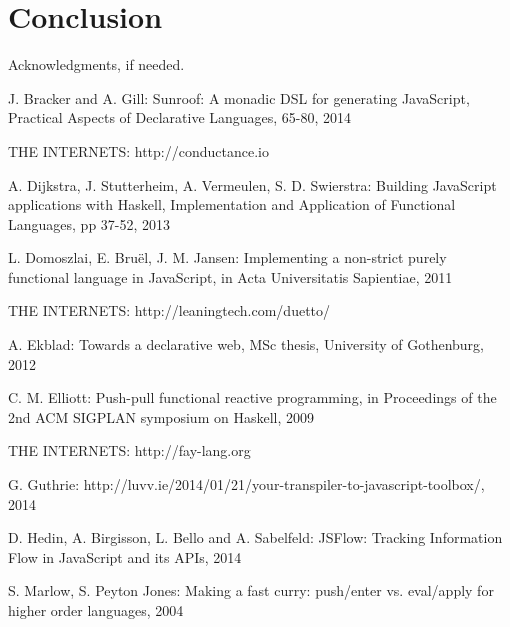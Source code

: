 \documentclass[preprint]{sigplanconf}
\begin{document}
\section{Conclusion}

\acks

Acknowledgments, if needed.





\begin{thebibliography}{}
\softraggedright

J. Bracker and A. Gill: Sunroof: A monadic DSL for generating JavaScript, Practical Aspects of Declarative Languages, 65-80, 2014

THE INTERNETS: http://conductance.io

A. Dijkstra, J. Stutterheim, A. Vermeulen, S. D. Swierstra: Building JavaScript applications with Haskell, Implementation and Application of Functional Languages, pp 37-52, 2013

L. Domoszlai, E. Bruël, J. M. Jansen: Implementing a non-strict purely functional language in JavaScript, in Acta Universitatis Sapientiae, 2011

THE INTERNETS: http://leaningtech.com/duetto/

A. Ekblad: Towards a declarative web, MSc thesis, University of Gothenburg, 2012

C. M. Elliott: Push-pull functional reactive programming, in Proceedings of the 2nd ACM SIGPLAN symposium on Haskell, 2009

THE INTERNETS: http://fay-lang.org

G. Guthrie: http://luvv.ie/2014/01/21/your-transpiler-to-javascript-toolbox/, 2014

D. Hedin, A. Birgisson, L. Bello and A. Sabelfeld: JSFlow: Tracking Information Flow in JavaScript and its APIs, 2014

S. Marlow, S. Peyton Jones: Making a fast curry: push/enter vs. eval/apply for higher order languages, 2004


\end{thebibliography}
\end{document}
